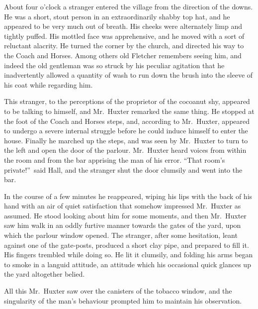 About four o’clock a stranger entered the village from the direction of the downs. He was a short, stout person in an extraordinarily shabby top hat, and he appeared to be very much out of breath. His cheeks were alternately limp and tightly puffed. His mottled face was apprehensive, and he moved with a sort of reluctant alacrity. He turned the corner by the church, and directed his way to the Coach and Horses. Among others old Fletcher remembers seeing him, and indeed the old gentleman was so struck by his peculiar agitation that he inadvertently allowed a quantity of wash to run down the brush into the sleeve of his coat while regarding him.

This stranger, to the perceptions of the proprietor of the cocoanut shy, appeared to be talking to himself, and Mr.\ Huxter remarked the same thing. He stopped at the foot of the Coach and Horses steps, and, according to Mr.\ Huxter, appeared to undergo a severe internal struggle before he could induce himself to enter the house. Finally he marched up the steps, and was seen by Mr.\ Huxter to turn to the left and open the door of the parlour. Mr.\ Huxter heard voices from within the room and from the bar apprising the man of his error. “That room’s private!”\ said Hall, and the stranger shut the door clumsily and went into the bar.

In the course of a few minutes he reappeared, wiping his lips with the back of his hand with an air of quiet satisfaction that somehow impressed Mr.\ Huxter as assumed. He stood looking about him for some moments, and then Mr.\ Huxter saw him walk in an oddly furtive manner towards the gates of the yard, upon which the parlour window opened. The stranger, after some hesitation, leant against one of the gate-posts, produced a short clay pipe, and prepared to fill it. His fingers trembled while doing so. He lit it clumsily, and folding his arms began to smoke in a languid attitude, an attitude which his occasional quick glances up the yard altogether belied.

All this Mr.\ Huxter saw over the canisters of the tobacco window, and the singularity of the man’s behaviour prompted him to maintain his observation.

